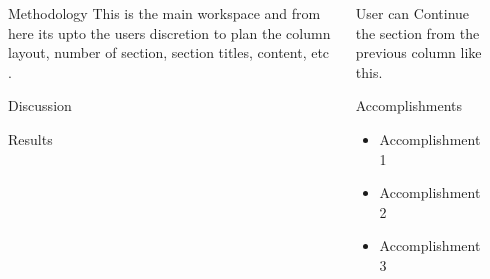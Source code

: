 \documentclass[serif,mathserif,final]{beamer}
\begin{document}
\begin{frame}{}
\begin{columns}[t]
\begin{column}{0.32\linewidth}
    \end{column}%

    \begin{column}{0.32\linewidth}

      \begin{block}{Methodology}
        \justifying
        This is the main workspace and from here its upto the users discretion to plan the column layout, number of section, section titles, content, etc . 
        \vspace{5in}
      \end{block}
      
      \begin{block}{Discussion}
        \vspace{5in}
      \end{block}

    \begin{block}{Results}
       \vspace{5in}
     \end{block}
    \end{column}%

    \begin{column}{0.32\linewidth}
      \vspace{1in}
      User can Continue the section from the previous column like this.
      \vspace{8in}

      \begin{block}{Accomplishments}
        \justifying
         \vspace{2in}
        \begin{itemize}
        \item Accomplishment 1
        \item Accomplishment 2
        \item Accomplishment 3
        \end{itemize}
        \vspace{2in}
      \end{block}



    \end{column}

  \end{columns}
\end{frame}
\end{document}
